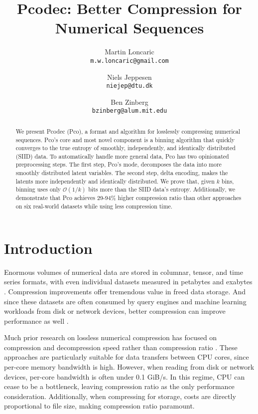 \documentclass[letterpaper]{article}
\title{Pcodec: Better Compression for Numerical Sequences}
\author{
Martin Loncaric \\
\texttt{m.w.loncaric@gmail.com}
\and
Niels Jeppesen \\
\texttt{niejep@dtu.dk}
\and
Ben Zinberg \\
\texttt{bzinberg@alum.mit.edu}
}
\date{}
\begin{document}
\maketitle

\begin{abstract}
We present Pcodec (Pco), a format and algorithm for losslessly compressing numerical sequences.
Pco's core and most novel component is a binning algorithm that quickly converges to the true entropy of smoothly, independently, and identically distributed (SIID) data.
To automatically handle more general data, Pco has two opinionated preprocessing steps.
The first step, Pco's mode, decomposes the data into more smoothly distributed latent variables.
The second step, delta encoding, makes the latents more independently and identically distributed.
We prove that, given $k$ bins, binning uses only $\mathcal{O}(1/k)$ bits more than the SIID data's entropy.
Additionally, we demonstrate that Pco achieves 29-94\% higher compression ratio than other approaches on six real-world datasets while using less compression time.
\end{abstract}

\section{Introduction}

Enormous volumes of numerical data are stored in columnar, tensor, and time series formats, with even individual datasets measured in petabytes and exabytes \cite{twitter_exabyte,photon_exabyte,tensor_store}.
Compression improvements offer tremendous value in freed data storage.
And since these datasets are often consumed by query engines and machine learning workloads from disk or network devices, better compression can improve performance as well \cite{compression_in_databases}.

Much prior research on lossless numerical compression has focused on compression and decompression speed rather than compression ratio \cite{fast_pfor,fast_lanes,fast_int_simd,general_simd}.
These approaches are particularly suitable for data transfers between CPU cores, since per-core memory bandwidth is high.
However, when reading from disk or network devices, per-core bandwidth is often under 0.1 GiB/s.
In this regime, CPU can cease to be a bottleneck, leaving compression ratio as the only performance consideration.
Additionally, when compressing for storage, costs are directly proportional to file size, making compression ratio paramount.
\end{document}
